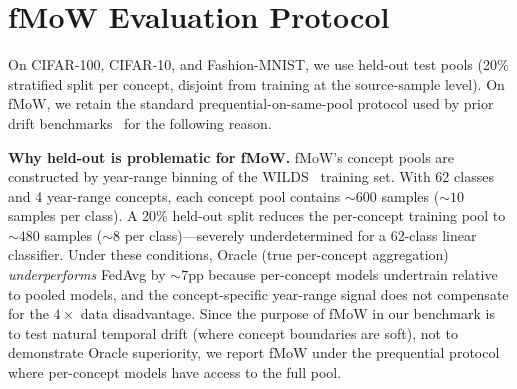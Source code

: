 \documentclass[11pt]{article}
\begin{document}
\section{fMoW Evaluation Protocol}
\label{app:fmow_protocol}

On CIFAR-100, CIFAR-10, and Fashion-MNIST, we use held-out test pools (20\% stratified split per concept, disjoint from training at the source-sample level).
On fMoW, we retain the standard prequential-on-same-pool protocol used by prior drift benchmarks~\citep{jothimurugesan2023federated, panchal2023flash} for the following reason.

\textbf{Why held-out is problematic for fMoW.}
fMoW's concept pools are constructed by year-range binning of the WILDS~\citep{koh2021wilds} training set.
With 62 classes and 4 year-range concepts, each concept pool contains ${\sim}600$ samples (${\sim}10$ samples per class).
A 20\% held-out split reduces the per-concept training pool to ${\sim}480$ samples (${\sim}8$ per class)---severely underdetermined for a 62-class linear classifier.
Under these conditions, Oracle (true per-concept aggregation) \emph{underperforms} FedAvg by ${\sim}7$pp because per-concept models undertrain relative to pooled models, and the concept-specific year-range signal does not compensate for the $4\times$ data disadvantage.
Since the purpose of fMoW in our benchmark is to test natural temporal drift (where concept boundaries are soft), not to demonstrate Oracle superiority, we report fMoW under the prequential protocol where per-concept models have access to the full pool.
\end{document}
